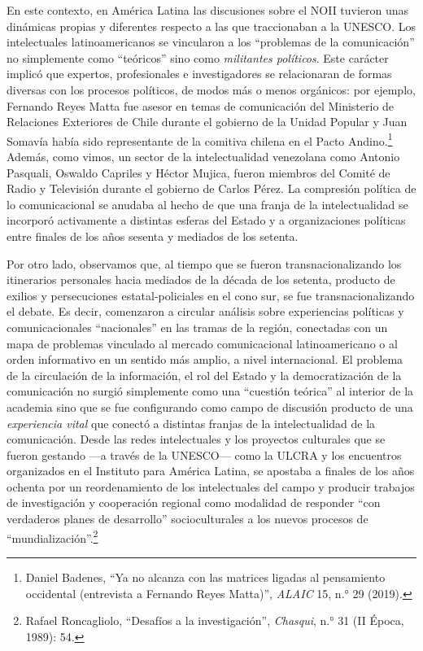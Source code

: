 \documentclass{tufte-handout}
\begin{document}
En este contexto, en América Latina las discusiones sobre el NOII
tuvieron unas dinámicas propias y diferentes respecto a las que
traccionaban a la UNESCO. Los intelectuales latinoamericanos se
vincularon a los ``problemas de la comunicación'' no simplemente como
``teóricos'' sino como \emph{militantes políticos}. Este carácter
implicó que expertos, profesionales e investigadores se relacionaran de
formas diversas con los procesos políticos, de modos más o menos
orgánicos: por ejemplo, Fernando Reyes Matta fue asesor en temas de
comunicación del Ministerio de Relaciones Exteriores de Chile durante el
gobierno de la Unidad Popular y Juan Somavía había sido representante de
la comitiva chilena en el Pacto Andino.\footnote{Daniel Badenes, ``Ya no
  alcanza con las matrices ligadas al pensamiento occidental (entrevista
  a Fernando Reyes Matta)'', \emph{ALAIC} 15, n.° 29 (2019).} Además,
como vimos, un sector de la intelectualidad venezolana como Antonio
Pasquali, Oswaldo Capriles y Héctor Mujica, fueron miembros del Comité
de Radio y Televisión durante el gobierno de Carlos Pérez. La compresión
política de lo comunicacional se anudaba al hecho de que una franja de
la intelectualidad se incorporó activamente a distintas esferas del
Estado y a organizaciones políticas entre finales de los años sesenta y
mediados de los setenta.

Por otro lado, observamos que, al tiempo que se fueron
transnacionalizando los itinerarios personales hacia mediados de la
década de los setenta, producto de exilios y persecuciones
estatal-policiales en el cono sur, se fue transnacionalizando el debate.
Es decir, comenzaron a circular análisis sobre experiencias políticas y
comunicacionales ``nacionales'' en las tramas de la región, conectadas
con un mapa de problemas vinculado al mercado comunicacional
latinoamericano o al orden informativo en un sentido más amplio, a nivel
internacional. El problema de la circulación de la información, el rol
del Estado y la democratización de la comunicación no surgió simplemente
como una ``cuestión teórica'' al interior de la academia sino que se fue
configurando como campo de discusión producto de una \emph{experiencia
vital} que conectó a distintas franjas de la intelectualidad de la
comunicación. Desde las redes intelectuales y los proyectos culturales
que se fueron gestando ---a través de la UNESCO--- como la ULCRA y los
encuentros organizados en el Instituto para América Latina, se apostaba
a finales de los años ochenta por un reordenamiento de los intelectuales
del campo y producir trabajos de investigación y cooperación regional
como modalidad de responder ``con verdaderos planes de desarrollo''
socioculturales a los nuevos procesos de ``mundialización''.\footnote{Rafael
  Roncagliolo, ``Desafíos a la investigación'', \emph{Chasqui}, n.° 31
  (II Época, 1989): 54.}
\end{document}

